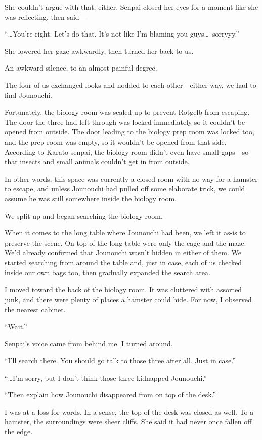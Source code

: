 \documentclass[
    a4paper,
    12pt,
    twoside,
    openany,
    UTF8,
    fontset=windows
]{ctexbook}
\begin{document}
She couldn't argue with that, either. Senpai closed her eyes for a moment like she was reflecting, then said---

``\dots You're right. Let's do that. It's not like I'm blaming you guys\dots\ sorryyy.''

She lowered her gaze awkwardly, then turned her back to us.

An awkward silence, to an almost painful degree.

The four of us exchanged looks and nodded to each other---either way, we had to find Jounouchi.

Fortunately, the biology room was sealed up to prevent Rotgelb from escaping. The door the three had left through was locked immediately so it couldn't be opened from outside. The door leading to the biology prep room was locked too, and the prep room was empty, so it wouldn't be opened from that side. According to Karato-senpai, the biology room didn't even have small gaps---so that insects and small animals couldn't get in from outside.

In other words, this space was currently a closed room with no way for a hamster to escape, and unless Jounouchi had pulled off some elaborate trick, we could assume he was still somewhere inside the biology room.

We split up and began searching the biology room.

When it comes to the long table where Jounouchi had been, we left it as-is to preserve the scene. On top of the long table were only the cage and the maze. We'd already confirmed that Jounouchi wasn't hidden in either of them. We started searching from around the table and, just in case, each of us checked inside our own bags too, then gradually expanded the search area.

I moved toward the back of the biology room. It was cluttered with assorted junk, and there were plenty of places a hamster could hide. For now, I observed the nearest cabinet.

``Wait.''

Senpai's voice came from behind me. I turned around.

``I'll search there. You should go talk to those three after all. Just in case.''

``\dots I'm sorry, but I don't think those three kidnapped Jounouchi.''

``Then explain how Jounouchi disappeared from on top of the desk.''

I was at a loss for words. In a sense, the top of the desk was closed as well. To a hamster, the surroundings were sheer cliffs. She said it had never once fallen off the edge.
\end{document}
